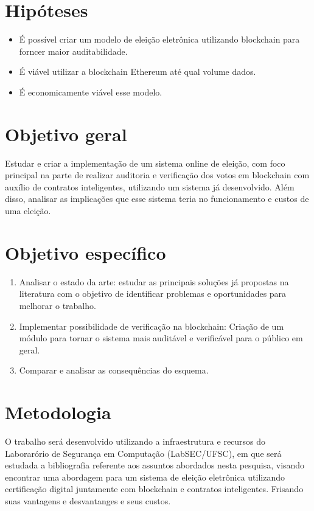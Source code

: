 \documentclass{ufsctex/ufsctex}
\begin{document}
\section{Hipóteses}

\begin{itemize}
	\item É possível criar um modelo de eleição eletrônica utilizando blockchain
		para forncer maior auditabilidade.
	\item É viável utilizar a blockchain Ethereum até qual volume dados.
	\item É economicamente viável esse modelo.
\end{itemize}

\section{Objetivo geral}

Estudar e criar a implementação de um sistema online de eleição, com foco
principal na parte de realizar auditoria e verificação dos votos em blockchain
com auxílio de contratos inteligentes, utilizando um sistema já desenvolvido.
Além disso, analisar as implicações que esse sistema teria no funcionamento e
custos de uma eleição. \\

\section{Objetivo específico}

\begin{enumerate}[label=\roman*.]
	\item Analisar o estado da arte: estudar as principais soluções
	já propostas na literatura com o objetivo de identificar problemas
	e oportunidades para melhorar o trabalho.
	\item Implementar possibilidade de verificação na blockchain:
	Criação de  um módulo para tornar o sistema mais auditável e 
	verificável para o público em geral.
	\item Comparar e analisar as consequências do esquema.
\end{enumerate}

\section{Metodologia}

O trabalho será desenvolvido utilizando a infraestrutura e recursos do
Laborarório de Segurança em Computação (LabSEC/UFSC), em que será estudada a
bibliografia referente aos assuntos abordados nesta pesquisa, visando encontrar
uma abordagem para um sistema de eleição eletrônica utilizando certificação
digital juntamente com blockchain e contratos inteligentes.  Frisando suas
vantagens e desvantanges e seus custos.
\end{document}
